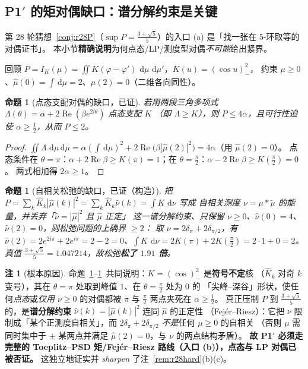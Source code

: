 \documentclass[UTF8,11pt]{ctexart}
\newtheorem{proposition}[theorem]{命题}
\theoremstyle{definition}
\newtheorem{remark}[theorem]{注}
\newcommand{\dd}{\,\mathrm{d}}
\begin{document}
\subsection{P1$'$ 的矩对偶缺口：谱分解约束是关键}\label{sec:r29:dual}

第 28 轮猜想~\ref{conj:r28P}（$\sup P=\frac{3+\sqrt5}5$）的入口 (a) 是「找一张在 $5$-环取等的对偶证书」。
本小节\textbf{精确说明}为何点态/LP/测度型对偶\emph{不可能}给出紧界。

回顾 $P=I_K(\mu)=\iint K(\varphi-\varphi')\,\dd\mu\,\dd\mu'$，$K(u)=(\cos u)_-^2$，
约束 $\mu\ge0$、$\widehat\mu(0)=\int\dd\mu=2$、$\widehat\mu(2)=0$（二维各向同性）。

\begin{proposition}[点态支配对偶的缺口，已证]\label{prop:r29pointwise}
若用两段三角多项式 $\Lambda(\theta)=\alpha+2\operatorname{Re}(\beta e^{2i\theta})$ 点态支配 $K$
（即 $\Lambda\ge K$），则 $P\le4\alpha$，且可行性迫使 $\alpha\ge\frac12$，从而 $P\le2$。
\end{proposition}
\begin{proof}
$\iint\Lambda\,\dd\mu\dd\mu=\alpha(\int\dd\mu)^2+2\operatorname{Re}\bigl(\beta|\widehat\mu(2)|^2\bigr)=4\alpha$（用 $\widehat\mu(2)=0$）。
点态条件在 $\theta=\pi$：$\alpha+2\operatorname{Re}\beta\ge K(\pi)=1$；在 $\theta=\frac\pi2$：$\alpha-2\operatorname{Re}\beta\ge K(\frac\pi2)=0$。
两式相加得 $2\alpha\ge1$。
\end{proof}

\begin{proposition}[自相关松弛的缺口，已证（构造）]\label{prop:r29gap}
把 $P=\sum_k\widehat K_k|\widehat\mu(k)|^2=\sum_k\widehat K_k\widehat\nu(k)=\int K\,\dd\nu$ 写成
自相关测度 $\nu=\mu*\widetilde\mu$ 的能量，并\emph{丢弃}「$\widehat\nu=|\widehat\mu|^2$ 且 $\widehat\mu$ 正定」
这一谱分解约束、只保留 $\nu\ge0$、$\widehat\nu(0)=4$、$\widehat\nu(2)=0$，则松弛问题的上确界 $\ge2$：
取 $\nu=2\delta_\pi+2\delta_{\pi/2}$，有 $\widehat\nu(2)=2e^{2i\pi}+2e^{i\pi}=2-2=0$、$\int K\,\dd\nu=2K(\pi)+2K(\tfrac\pi2)=2\cdot1+0=2$。
真值 $\frac{3+\sqrt5}5=1.047214$，故松弛\textbf{松了 $1.91$ 倍}。
\end{proposition}
\begin{remark}[根本原因]\label{rem:r29rootcause}
命题~\ref{prop:r29pointwise}--\ref{prop:r29gap}~共同说明：$K=(\cos)_-^2$ 是\textbf{符号不定}核
（$\widehat K_k$ 对奇 $k$ 变号），其在 $\theta=\pi$ 处取到峰值 $1$、在 $\theta=\frac\pi2$ 处为 $0$ 的
「尖峰--深谷」形状，使任何\emph{点态}或\emph{仅用 $\nu\ge0$} 的对偶都被 $\pi$ 与 $\frac\pi2$ 两点夹死在 $\alpha\ge\frac12$。
真正压制 $P$ 到 $\frac{3+\sqrt5}5$ 的，是\textbf{谱分解约束} $\widehat\nu(k)=|\widehat\mu(k)|^2$ 连同 $\widehat\mu$ 的正定性
（Fejér--Riesz）：它把 $\nu$ 限制成「某个正测度自相关」，而 $2\delta_\pi+2\delta_{\pi/2}$ \emph{不是}任何 $\mu\ge0$ 的自相关
（否则 $\mu$ 需同时集中于 $\pm$ 某两点并满足 $\widehat\mu(2)=0$，与 $\nu$ 的两点结构矛盾）。
\textbf{故 P1$'$ 必须走完整的 Toeplitz--PSD 矩/Fejér--Riesz 路线（入口 (b)），点态与 LP 对偶已被否证。}
这独立地证实并\emph{ sharpen }了注~\ref{rem:r28hard}(b)(c)。
\end{remark}
\end{document}
